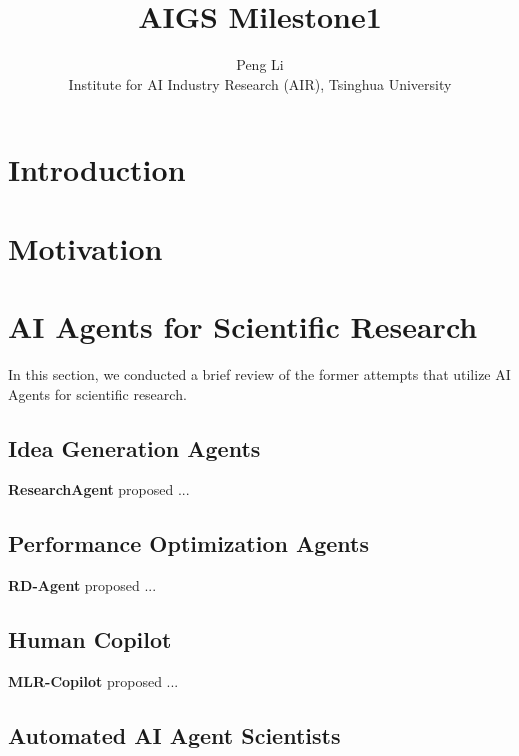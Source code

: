 \documentclass{article} %
\title{AIGS Milestone1}
\author{Peng Li\\
Institute for AI Industry Research (AIR), Tsinghua University\\}
\begin{document}
\maketitle

\begin{abstract}

\end{abstract}

\section{Introduction}

\section{Motivation}


\section{AI Agents for Scientific Research}

In this section, we conducted a brief review of the former attempts that utilize AI Agents for scientific research.

\subsection{Idea Generation Agents}

\textbf{ResearchAgent}\citep{baek2024researchagentiterativeresearchidea} proposed ...

\subsection{Performance Optimization Agents}

\textbf{RD-Agent}\citep{chen2024datacentric} proposed ...
 
\subsection{Human Copilot}

\textbf{MLR-Copilot}\citep{li2024mlrcopilotautonomousmachinelearning} proposed ...

\subsection{Automated AI Agent Scientists}
\end{document}
